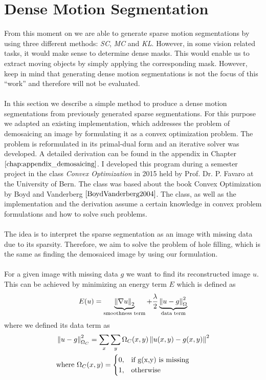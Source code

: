 \section{Dense Motion Segmentation}
\label{sec:dense_motion_segmentation}
From this moment on we are able to generate sparse motion segmentations by using three different methods: \textit{SC}, \textit{MC} and \textit{KL}. However, in some vision related tasks, it would make sense to determine dense masks. This would enable us to extract moving objects by simply applying the corresponding mask. However, keep in mind that generating dense motion segmentations is not the focus of this \enquote{work} and therefore will not be evaluated. \\ \\
In this section we describe a simple method to produce a dense motion segmentations from previously generated sparse segmentations. For this purpose we adapted an existing implementation, which addresses the problem of demosaicing an image by formulating it as a convex optimization problem. The problem is reformulated in its primal-dual form and an iterative solver was developed. A detailed derivation can be found in the appendix in Chapter $\ref{chap:appendix_demosaicing}$. I developed this program during a semester project in the class \textit{Convex Optimization} in 2015 held by Prof. Dr. P. Favaro at the University of Bern. The class was based about the book Convex Optimization by Boyd and Vanderberg $\cite{BoydVanderberg2004}$. The class, as well as the implementation and the derivation assume a certain knowledge in convex problem formulations and how to solve such problems. \\ \\
The idea is to interpret the sparse segmentation as an image with missing data due to its sparsity. Therefore, we aim to solve the problem of hole filling, which is the same as finding the demosaiced image by using our formulation. \\ \\
For a given image with missing data $g$ we want to find its reconstructed image $u$. This can be achieved by minimizing an energy term $E$ which is defined as 
\begin{equation}
	E(u) = \underbrace{\left\lVert\nabla u\right\rVert_2}_{\text{smoothness term}} + \frac{\lambda}{2} \underbrace{\left\lVert u - g\right\rVert^2_{\Omega}}_{\text{data term}}	
\end{equation}
where we defined its data term as
\begin{equation}
\begin{aligned}
& \norm{u - g}^2_{\Omega_{C}} = \sum_x \sum_y \Omega_{C}(x,y)\norm{u(x,y) - g(x,y)}^2 \\
& \text{where } \Omega_{C}(x,y)= 
\begin{cases}
    0,& \text{if } $g(x,y)$ \text{ is missing}\\
    1,              & \text{otherwise}
\end{cases}
\end{aligned}
\end{equation}
